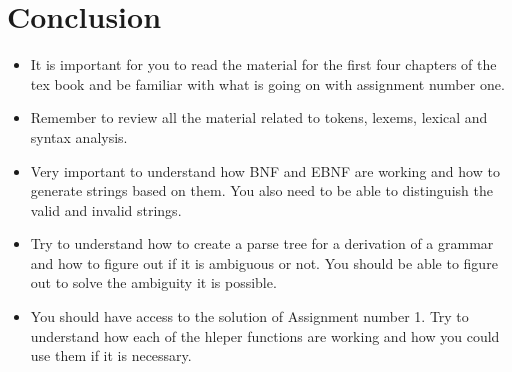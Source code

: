 \documentclass[11pt]{article}
\begin{document}
\section{Conclusion}
\label{sec:org7f115cc}


\begin{itemize}
\item It is important for you to read the material for the first four chapters of the
tex book and be familiar with what is going on with assignment number one.

\item Remember to review all the material related to tokens, lexems, lexical and
syntax analysis.

\item Very important to understand how BNF and EBNF are working and how to generate
strings based on them. You also need to be able to distinguish the valid and
invalid strings.

\item Try to understand how to create a parse tree for a derivation of a grammar and
how to figure out if it is ambiguous or not. You should be able to figure out
to solve the ambiguity it is possible.

\item You should have access to the solution of Assignment number 1. Try to
understand how each of the hleper functions are working and how you could use
them if it is necessary.
\end{itemize}
\end{document}
